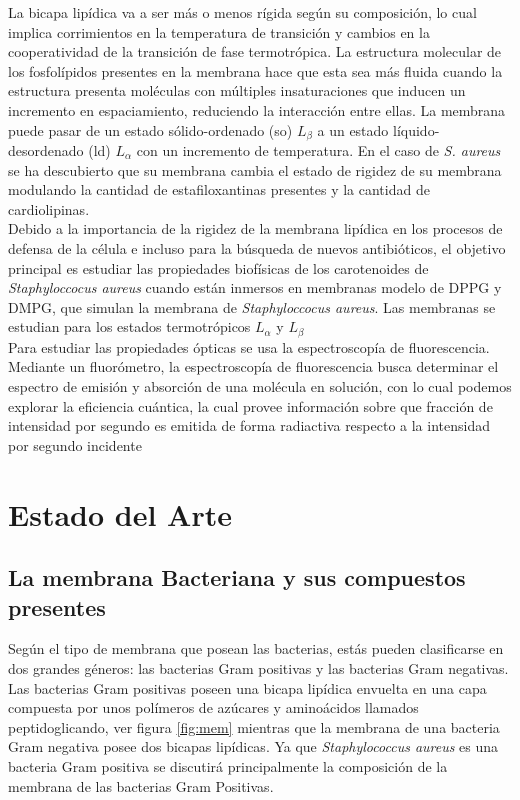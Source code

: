 \documentclass[12pt]{article}
\begin{document}
La bicapa lipídica va a ser m\'as o menos r\'igida según su composición, lo cual implica corrimientos en la temperatura de transici\'on y cambios en la cooperatividad de la transici\'on de fase termotrópica. La estructura molecular de los fosfol\'ipidos presentes en la membrana hace que esta sea m\'as fluida cuando la estructura presenta mol\'eculas con m\'ultiples insaturaciones que inducen un incremento en espaciamiento, reduciendo la interacci\'on entre ellas. La membrana puede pasar de un estado s\'olido-ordenado (so) $L_{\beta}$ a un estado l\'iquido-desordenado (ld) $L_{\alpha}$ con un incremento de temperatura. En el caso de \textit{S. aureus} se ha descubierto que su membrana cambia el estado de rigidez de su membrana modulando la cantidad de estafiloxantinas presentes y la cantidad de cardiolipinas. \\

Debido a la importancia de la rigidez de la membrana lip\'idica en los procesos de defensa de la c\'elula e incluso para la b\'usqueda de nuevos antibi\'oticos, el objetivo principal es estudiar las propiedades biofísicas de los carotenoides de \textit{Staphyloccocus aureus} cuando están inmersos en membranas modelo de DPPG y DMPG, que simulan la membrana de \textit{Staphyloccocus aureus}.  Las membranas se estudian para los estados termotrópicos  $L_{\alpha}$ y  $L_{\beta}$ \\

Para estudiar las propiedades ópticas se usa la espectroscopía de fluorescencia. Mediante un fluorómetro, la espectroscopía de fluorescencia busca determinar el espectro de emisión y absorción de una molécula en solución, con lo cual podemos explorar la eficiencia cuántica, la cual provee información sobre que fracción de intensidad por segundo es emitida de forma radiactiva respecto a la intensidad por segundo incidente

\section{Estado del Arte}
\subsection{La membrana Bacteriana y sus compuestos presentes}\label{ss:mem}
Según el tipo de membrana que posean las bacterias, estás pueden clasificarse en dos grandes géneros: las bacterias Gram positivas y las bacterias Gram negativas. Las bacterias Gram positivas poseen una bicapa lipídica envuelta en una capa compuesta por unos polímeros de azúcares y aminoácidos llamados peptidoglicando, ver figura \ref{fig:mem} mientras que la membrana de una bacteria Gram negativa posee dos bicapas lipídicas. Ya que \textit{Staphylococcus aureus} es una bacteria Gram positiva se discutirá principalmente la composición de la membrana de las bacterias Gram Positivas.\\
\end{document}
